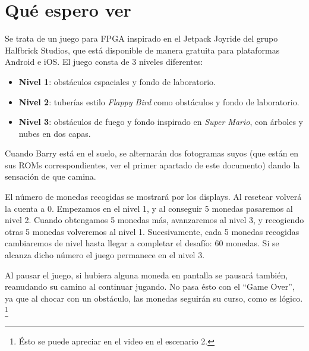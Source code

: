 \documentclass[11pt, a4paper, spanish, openright, twoside]{book}
\begin{document}
\section{Qué espero ver}
Se trata de un juego para FPGA inspirado en el Jetpack Joyride del grupo Halfbrick Studios, que está disponible de manera gratuita para plataformas Android e iOS. El juego consta de 3 niveles diferentes:

\begin{itemize}
	\item \textbf{Nivel 1}: obstáculos espaciales y fondo de laboratorio.
	\item \textbf{Nivel 2}: tuberías estilo \emph{Flappy Bird} como obstáculos y fondo de laboratorio.
	\item \textbf{Nivel 3}: obstáculos de fuego y fondo inspirado en \emph{Super Mario}, con árboles y nubes en dos capas.
\end{itemize}

Cuando Barry está en el suelo, se alternarán dos fotogramas suyos (que están en sus ROMs correspondientes, ver el primer apartado de este documento) dando la sensación de que camina. 

El número de monedas recogidas se mostrará por los displays. Al resetear volverá la cuenta a 0. Empezamos en el nivel 1, y al conseguir 5 monedas pasaremos al nivel 2. Cuando obtengamos 5 monedas más, avanzaremos al nivel 3, y recogiendo otras 5 monedas volveremos al nivel 1. Sucesivamente, cada 5 monedas recogidas cambiaremos de nivel hasta llegar a completar el desafío: 60 monedas. Si se alcanza dicho número el juego permanece en el nivel 3.

Al pausar el juego, si hubiera alguna moneda en pantalla se pausará también, reanudando su camino al continuar jugando. No pasa ésto con el ``Game Over'', ya que al chocar con un obstáculo, las monedas seguirán su curso, como es lógico. \footnote{Ésto se puede apreciar en el video en el escenario 2.}
\end{document}
